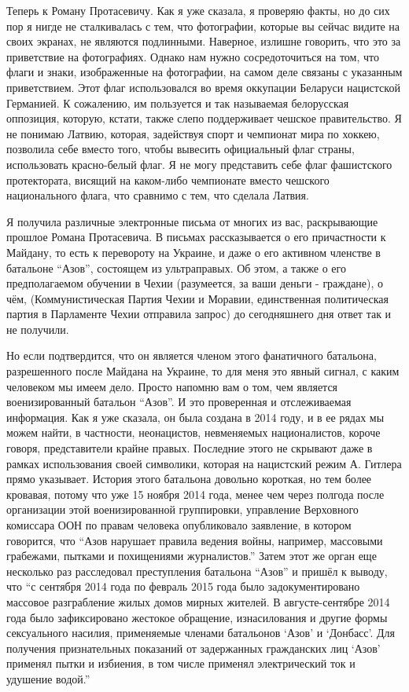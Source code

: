 Теперь к Роману Протасевичу. Как я уже сказала, я проверяю факты, но до сих пор
я нигде не сталкивалась с тем, что фотографии, которые вы сейчас видите на
своих экранах, не являются подлинными. Наверное, излишне говорить, что это за
приветствие на фотографиях. Однако нам нужно сосредоточиться на том, что флаги
и знаки, изображенные на фотографии, на самом деле связаны с указанным
приветствием. Этот флаг использовался во время оккупации Беларуси нацистской
Германией. К сожалению, им пользуется и так называемая белорусская оппозиция,
которую, кстати, также слепо поддерживает чешское правительство. Я не понимаю
Латвию, которая, задействуя спорт и чемпионат мира по хоккею, позволила себе
вместо того, чтобы вывесить официальный флаг страны, использовать красно-белый
флаг. Я не могу представить себе флаг фашистского протектората, висящий на
каком-либо чемпионате вместо чешского национального флага, что сравнимо с тем,
что сделала Латвия.

Я получила различные электронные письма от многих из вас, раскрывающие прошлое
Романа Протасевича. В письмах рассказывается о его причастности к Майдану, то
есть к перевороту на Украине, и даже о его активном членстве в батальоне
\enquote{Азов}, состоящем из ультраправых. Об этом, а также о его предполагаемом
обучении в Чехии (разумеется, за ваши деньги - граждане), о чём,
(Коммунистическая Партия Чехии и Моравии, единственная политическая партия в
Парламенте Чехии отправила запрос) до сегодняшнего дня ответ так и не получили.

Но если подтвердится, что он является членом этого фанатичного батальона,
разрешенного после Майдана на Украине, то для меня это явный сигнал, с каким
человеком мы имеем дело. Просто напомню вам о том, чем является военизированный
батальон \enquote{Азов}. И это проверенная и отслеживаемая информация. Как я уже
сказала, он была создана в 2014 году, и в ее рядах мы можем найти, в частности,
неонацистов, невменяемых националистов, короче говоря, представители крайне
правых. Последние этого не скрывают даже в рамках использования своей
символики, которая на нацистский режим А. Гитлера прямо указывает. История
этого батальона довольно короткая, но тем более кровавая, потому что уже 15
ноября 2014 года, менее чем через полгода после организации этой
военизированной группировки, управление Верховного комиссара ООН по правам
человека опубликовало заявление, в котором говорится, что \enquote{Азов нарушает
правила ведения войны, например, массовыми грабежами, пытками и похищениями
журналистов.} Затем этот же орган еще несколько раз расследовал преступления
батальона \enquote{Азов} и пришёл к выводу, что \enquote{с сентября 2014 года по февраль 2015
года было задокументировано массовое разграбление жилых домов мирных жителей. В
августе-сентябре 2014 года было зафиксировано жестокое обращение, изнасилования
и другие формы сексуального насилия, применяемые членами батальонов \enquote{Азов} и
\enquote{Донбасс}. Для получения признательных показаний от задержанных гражданских лиц
\enquote{Азов} применял пытки и избиения, в том числе применял электрический ток и
удушение водой.}

